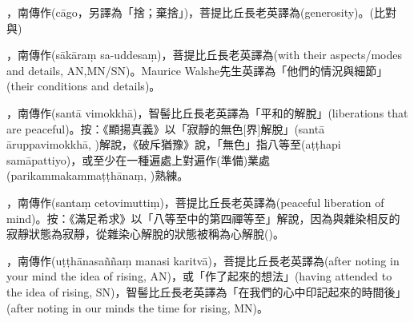\startitemgroup[noteitems]
\item{}，南傳作(cāgo，另譯為「捨；棄捨」)，菩提比丘長老英譯為(generosity)。(比對與)
\stopitemgroup

\startitemgroup[noteitems]
\item{}，南傳作(sākāraṃ sa-uddesaṃ)，菩提比丘長老英譯為(with their aspects/modes and details, AN,MN/SN)。Maurice Walshe先生英譯為「他們的情況與細節」(their conditions and details)。
\stopitemgroup

\startitemgroup[noteitems]
\item{}，南傳作(santā vimokkhā)，智髻比丘長老英譯為「平和的解脫」(liberations that are peaceful)。按：《顯揚真義》以「寂靜的無色[界]解脫」(santā āruppavimokkhā, )解說，《破斥猶豫》說，「無色」指八等至(aṭṭhapi samāpattiyo)，或至少在一種遍處上對遍作(準備)業處(parikammakammaṭṭhānaṃ, )熟練。
\item{}，南傳作(santaṃ cetovimuttiṃ)，菩提比丘長老英譯為(peaceful liberation of mind)。按：《滿足希求》以「八等至中的第四禪等至」解說，因為與雜染相反的寂靜狀態為寂靜，從雜染心解脫的狀態被稱為心解脫()。
\stopitemgroup

\startitemgroup[noteitems]
\item{}，南傳作(uṭṭhānasaññaṃ manasi karitvā)，菩提比丘長老英譯為(after noting in your mind the idea of rising, AN)，或「作了起來的想法」(having attended to the idea of rising, SN)，智髻比丘長老英譯為「在我們的心中印記起來的時間後」(after noting in our minds the time for rising, MN)。
\stopitemgroup

